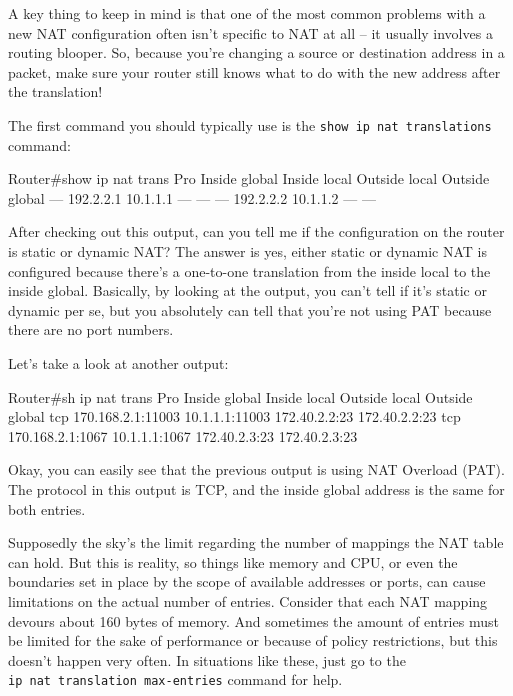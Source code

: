 A key thing to keep in mind is that one of the most common problems with
a new NAT configuration often isn't specific to NAT at all -- it usually
involves a routing blooper. So, because you're changing a source or
destination address in a packet, make sure your router still knows what
to do with the new address after the translation!

The first command you should typically use is the
\texttt{show\ ip\ nat\ translations} command:

\begin{cli}
Router#show ip nat trans
Pro   Inside global   Inside local   Outside local   Outside global
---   192.2.2.1       10.1.1.1       ---             ---
---   192.2.2.2       10.1.1.2       ---             ---
\end{cli}

After checking out this output, can you tell me if the configuration on
the router is static or dynamic NAT? The answer is yes, either static or
dynamic NAT is configured because there's a one-to-one translation from
the inside local to the inside global. Basically, by looking at the
output, you can't tell if it's static or dynamic per se, but you
absolutely can tell that you're not using PAT because there are no port
numbers.

Let's take a look at another output:

\begin{cli}
Router#sh ip nat trans
Pro Inside global      Inside local       Outside local      Outside global
tcp 170.168.2.1:11003  10.1.1.1:11003     172.40.2.2:23      172.40.2.2:23
tcp 170.168.2.1:1067   10.1.1.1:1067      172.40.2.3:23      172.40.2.3:23
\end{cli}

Okay, you can easily see that the previous output is using NAT Overload
(PAT). The protocol in this output is TCP, and the inside global address
is the same for both entries.

Supposedly the sky's the limit regarding the number of mappings the NAT
table can hold. But this is reality, so things like memory and CPU, or
even the boundaries set in place by the scope of available addresses or
ports, can cause limitations on the actual number of entries. Consider
that each NAT mapping devours about 160 bytes of memory. And sometimes
the amount of entries must be limited for the sake of performance or
because of policy restrictions, but this doesn't happen very often. In
situations like these, just go to the
\texttt{ip\ nat\ translation\ max-entries} command for help.

